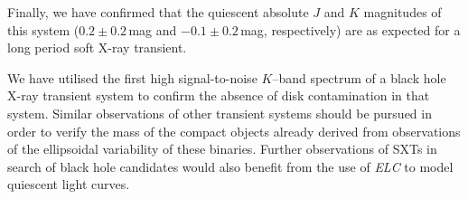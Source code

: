 \vspace{\myparskip}

Finally, we have confirmed that the quiescent absolute $J$ and $K$
magnitudes of this system ($0.2\pm0.2$\,mag and $-0.1\pm0.2$\,mag,
respectively) are as expected for a long period soft X-ray
transient. %

\vspace{\myparskip}

We have utilised the first high signal-to-noise $K$--band spectrum of a
black hole X-ray transient system to confirm the absence of disk
contamination in that system. Similar observations of other transient
systems should be pursued in order to verify the mass of the compact
objects already derived from observations of the ellipsoidal
variability of these binaries. Further observations of SXTs in search of black hole candidates would also benefit from the use of \textit{ELC} to model quiescent light curves. %


